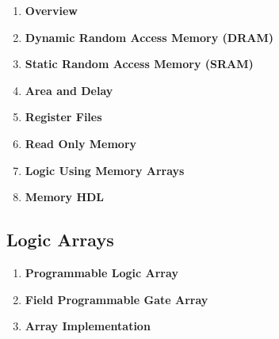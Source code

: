 \documentclass[12pt]{article}
\begin{document}
\begin{enumerate}
  \item \textbf{Overview}

  \item \textbf{Dynamic Random Access Memory (DRAM)}

  \item \textbf{Static Random Access Memory (SRAM)}

  \item \textbf{Area and Delay}

  \item \textbf{Register Files}

  \item \textbf{Read Only Memory}

  \item \textbf{Logic Using Memory Arrays}

  \item \textbf{Memory HDL}
\end{enumerate}

\subsection{Logic Arrays}

\begin{enumerate}
  \item \textbf{Programmable Logic Array}

  \item \textbf{Field Programmable Gate Array}

  \item \textbf{Array Implementation}
\end{enumerate}
\end{document}
